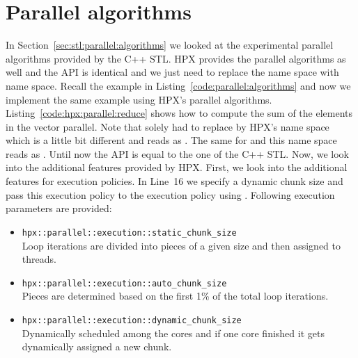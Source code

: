 \documentclass[11pt,fleqn]{book} %
\begin{document}
\section{Parallel algorithms}
In Section~\ref{sec:stl:parallel:algorithms} we looked at the experimental parallel algorithms provided by the C++ STL. HPX provides the parallel algorithms as well and the API is identical and we just need to replace the  name space with  name space. Recall the example in Listing~\ref{code:parallel:algorithms} and now we implement the same example using HPX's parallel algorithms. Listing~\ref{code:hpx:parallel:reduce} shows how to compute the sum of the elements in the vector  parallel. Note that solely had to replace  by HPX's name space which is a little bit different and reads as . The same for  and this name space reads as . Until now the API is equal to the one of the C++ STL. Now, we look into the additional features provided by HPX. First, we look into the additional features for execution policies. In Line~16 we specify a dynamic chunk size  and pass this execution policy to the execution policy using . Following execution parameters are provided:
\vspace{0.25cm}
\begin{itemize}
\item \lstinline|hpx::parallel::execution::static_chunk_size| \\
Loop iterations are divided into pieces of a given size and then assigned to threads.
\item \lstinline|hpx::parallel::execution::auto_chunk_size| \\
Pieces are determined based on the first 1\% of the total loop iterations. 
\item \lstinline|hpx::parallel::execution::dynamic_chunk_size| \\
Dynamically scheduled among the cores and if one core finished it gets dynamically assigned a new chunk.
\end{itemize}
\end{document}
